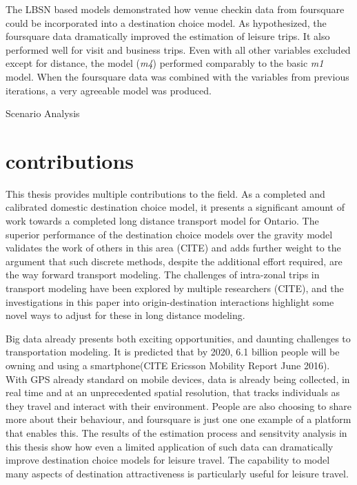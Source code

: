 The LBSN based models demonstrated how venue checkin data from foursquare could be incorporated into a destination choice model. As hypothesized, the foursquare data dramatically improved the estimation of leisure trips. It also performed well for visit and business trips. Even with all other variables excluded except for distance, the model (\textit{m4}) performed comparably to the basic \textit{m1} model. When the foursquare data was combined with the variables from previous iterations, a very agreeable model was produced. 

Scenario Analysis


\section{contributions}
This thesis provides multiple contributions to the field. As a completed and calibrated domestic destination choice model, it presents a significant amount of work towards a completed long distance transport model for Ontario. The superior performance of the destination choice models over the gravity model validates the work of others in this area (CITE)  %
and adds further weight to the argument that such discrete methods, despite the additional effort required, are the way forward transport modeling. The challenges of intra-zonal trips in transport modeling have been explored by multiple researchers (CITE), and the investigations in this paper into origin-destination interactions highlight some novel ways to adjust for these in long distance modeling.

Big data already presents both exciting opportunities, and daunting challenges to transportation modeling. It is predicted that by 2020, 6.1 billion people will be owning and using a smartphone(CITE Ericsson Mobility Report June 2016). With GPS already standard on mobile devices, data is already being collected, in real time and at an unprecedented spatial resolution, that tracks individuals as they travel and interact with their environment. People are also choosing to share more about their behaviour, and foursquare is just one one example of a platform that enables this. The results of the estimation process and sensitvity analysis in this thesis show how even a limited application of such data can dramatically improve destination choice models for leisure travel. The capability to model many aspects of destination attractiveness is particularly useful for leisure travel.

